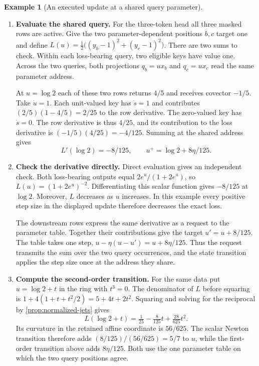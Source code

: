 \documentclass[11pt,a4paper]{article}
\theoremstyle{definition}
\newtheorem{example}[example]{Example}
\theoremstyle{remark}\newaliascnt{remark}{theorem}
\numberwithin{equation}{section}
\begin{document}
\begin{example}[An executed update at a shared query parameter]\label{ex:update}\leavevmode
\begin{enumerate}[titledsteps]
    \item \textbf{Evaluate the shared query.} For the three-token head all three masked rows are active. Give the two parameter-dependent positions $b,c$ target one and define
\(L(u)=\tfrac12\big((y_b-1)^2+(y_c-1)^2\big)\).
There are two sums to check. Within each loss-bearing query, two eligible keys have value one. Across the two queries, both projections $q_b=u x_b$ and $q_c=u x_c$ read the same parameter address.

At $u=\log 2$ each of these two rows returns $4/5$ and receives covector $-1/5$. Take $\dot u=1$. Each unit-valued key has $\dot s=1$ and contributes $(2/5)(1-4/5)=2/25$ to the row derivative. The zero-valued key has $\dot s=0$. The row derivative is thus $4/25$, and its contribution to the loss derivative is $(-1/5)(4/25)=-4/125$. Summing at the shared address gives
\[
 L'(\log2)=-8/125,\qquad u^+=\log2+8\eta/125 .
\]

    \item \textbf{Check the derivative directly.} Direct evaluation gives an independent check. Both loss-bearing outputs equal $2e^u/(1+2e^u)$, so $L(u)=(1+2e^u)^{-2}$. Differentiating this scalar function gives $-8/125$ at $\log 2$. Moreover, $L$ decreases as $u$ increases. In this example every positive step size in the displayed update therefore decreases the exact loss.

The downstream rows express the same derivative as a request to the parameter table. Together their contributions give the target $u'=u+8/125$. The table takes one step, $u-\eta(u-u')=u+8\eta/125$. Thus the request transmits the sum over the two query occurrences, and the state transition applies the step size once at the address they share.


    \item \textbf{Compute the second-order transition.} For the same data put $u=\log 2+t$ in the ring with $t^3=0$. The denominator of $L$ before squaring is $1+4(1+t+t^2/2)=5+4t+2t^2$. Squaring and solving for the reciprocal by \cref{prop:normalized-jets} gives
\[
             L(\log 2+t)=\tfrac1{25}-\tfrac8{125}t+\tfrac{28}{625}t^2 .
\]
Its curvature in the retained affine coordinate is $56/625$. The scalar Newton transition therefore adds $(8/125)/(56/625)=5/7$ to $u$, while the first-order transition above adds $8\eta/125$. Both use the one parameter table on which the two query positions agree.

\end{enumerate}
\end{example}
\end{document}
